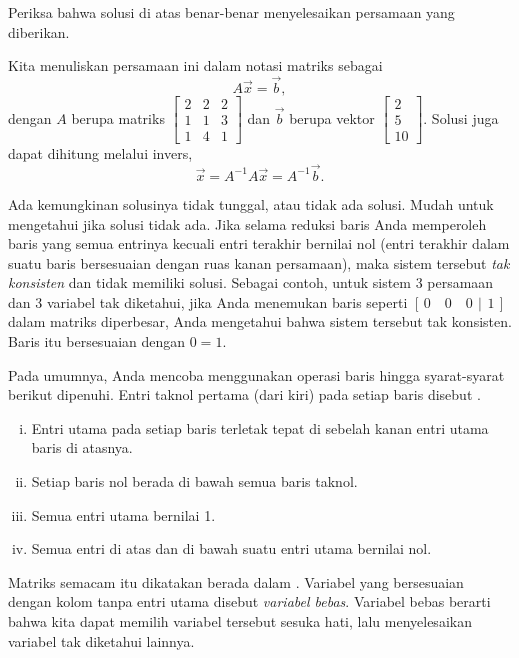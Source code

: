 \begin{exercise}
Periksa bahwa solusi di atas benar-benar menyelesaikan persamaan yang diberikan.
\end{exercise}

Kita menuliskan persamaan ini dalam notasi matriks sebagai
\begin{equation*}
A \vec{x} = \vec{b} ,
\end{equation*}
dengan $A$ berupa matriks
$\left[ \begin{smallmatrix}
2 & 2 & 2 \\
1 & 1 & 3 \\
1 & 4 & 1
\end{smallmatrix} \right]$ dan $\vec{b}$ berupa vektor
$\left[ \begin{smallmatrix}
2 \\
5 \\
10
\end{smallmatrix} \right]$.  Solusi juga dapat dihitung melalui
invers,
\begin{equation*}
\vec{x} = A^{-1} A \vec{x} = A^{-1} \vec{b} .
\end{equation*}

\medskip

Ada kemungkinan
solusinya tidak tunggal, atau tidak ada solusi.
Mudah untuk mengetahui jika solusi tidak ada.  Jika selama reduksi
baris Anda memperoleh baris yang semua entrinya kecuali entri terakhir
bernilai nol (entri terakhir dalam suatu baris bersesuaian dengan ruas kanan
persamaan), maka sistem tersebut \emph{tak konsisten} dan
tidak memiliki solusi.  Sebagai
contoh, untuk sistem 3 persamaan dan 3 variabel tak diketahui, jika Anda menemukan baris
seperti $[\,0 \quad 0 \quad 0 ~\,|\,~ 1\,]$ dalam matriks diperbesar,
Anda mengetahui bahwa sistem tersebut tak konsisten.  Baris itu bersesuaian dengan $0=1$.

\medskip

Pada umumnya, Anda mencoba menggunakan operasi baris hingga syarat-syarat berikut
dipenuhi.  Entri taknol pertama (dari kiri) pada setiap baris disebut
\emph{}.
\begin{enumerate}[(i)]
\item Entri utama pada setiap baris terletak tepat di sebelah kanan
entri utama baris di atasnya.
\item Setiap baris nol berada di bawah semua baris taknol.
\item Semua entri utama bernilai 1.
\item Semua entri di atas dan di bawah suatu entri utama bernilai nol.
\end{enumerate}
Matriks semacam itu dikatakan berada dalam
\emph{}.  Variabel yang
bersesuaian dengan kolom tanpa entri utama disebut
\emph{variabel bebas}.
Variabel bebas berarti bahwa kita dapat memilih variabel tersebut
sesuka hati, lalu menyelesaikan variabel tak diketahui lainnya.

